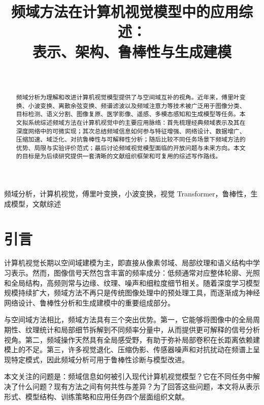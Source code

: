 \documentclass[journal,10pt]{IEEEtran}
\begin{document}
\title{频域方法在计算机视觉模型中的应用综述：\\ 表示、架构、鲁棒性与生成建模}

\author{
    \\
}

\maketitle

\begin{abstract}
频域分析为理解和改进计算机视觉模型提供了与空间域互补的视角。近年来，傅里叶变换、小波变换、离散余弦变换、频谱滤波以及频域注意力等技术被广泛用于图像分类、目标检测、语义分割、图像复原、医学影像、遥感、多模态感知和生成模型等任务。本文拟系统综述频域方法在计算机视觉中的主要应用脉络：首先梳理经典频域表示及其在深度网络中的可微实现；其次总结频域信息如何参与特征增强、网络设计、数据增广、压缩加速、域泛化、对抗鲁棒性与可解释性分析；随后比较不同任务场景下频域方法的优势、局限与实验评价范式；最后讨论频域视觉模型面临的开放问题与未来方向。本文的目标是为后续研究提供一套清晰的文献组织框架和可复用的综述写作路线。
\end{abstract}

\begin{IEEEkeywords}
频域分析，计算机视觉，傅里叶变换，小波变换，视觉 Transformer，鲁棒性，生成模型，文献综述
\end{IEEEkeywords}

\section{引言}
计算机视觉长期以空间域建模为主，即直接从像素邻域、局部纹理和语义结构中学习表示。然而，图像信号天然包含丰富的频率成分：低频通常对应整体轮廓、光照和全局结构，高频则常与边缘、纹理、噪声和细粒度细节相关。随着深度学习模型规模持续扩大，频域方法不再只是传统图像处理中的预处理工具，而逐渐成为神经网络设计、鲁棒性分析和生成建模中的重要组成部分。

与空间域方法相比，频域方法具有三个突出优势。第一，它能够将图像中的全局周期性、纹理统计和局部细节拆解到不同频率分量中，从而提供更可解释的信号分析视角。第二，频域操作天然具有全局感受野，有助于弥补局部卷积在长距离依赖建模上的不足。第三，许多视觉退化、压缩伪影、传感器噪声和对抗扰动在频谱上呈现特定模式，因此频域分析可用于鲁棒性诊断与模型改进。

本文关注的问题是：频域信息如何被引入现代计算机视觉模型？它在不同任务中解决了什么问题？现有方法之间有何共性与差异？为了回答这些问题，本文将从表示形式、模型结构、训练策略和应用任务四个层面组织文献。
\end{document}
